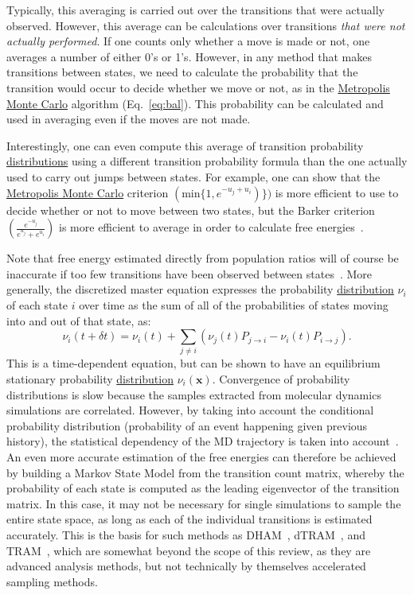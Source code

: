 \documentclass[9pt,review]{livecoms}
\newcommand{\vx}{\mathbf{x}}
\begin{document}
Typically, this averaging is carried out over the transitions that were actually observed. However, this average can be calculations over transitions \emph{that were not actually performed}. If one counts only whether a move is made or not, one averages a number of either 0's or 1's. However, in any method that makes transitions between states, we need to calculate the probability that the transition would occur to decide whether we move or not, as in the \hyperlink{ref:MetropolisMonteCarlo} {Metropolis Monte Carlo} algorithm (Eq.~\ref{eq:bal}).  This probability can be calculated and used in averaging even if the moves are not made.

Interestingly, one can even compute this average of transition probability \hyperlink{ref:Distribution} {distributions} using a different transition probability formula than the one actually used to carry out jumps between states. For example, one can show that the \hyperlink{ref:MetropolisMonteCarlo} {Metropolis Monte Carlo} criterion $(\mathrm{min} \{1,e^{-u_j+u_i})\})$ is more efficient to use to decide whether or not to move between two states, but the Barker criterion $\left(\frac{e^{-u_j}}{e^{u_j}+e^{u_i}}\right)$ is more efficient to average in order to calculate free energies~\citep{Liu:Biometrika:1996}.

Note that free energy estimated directly from population ratios will of course be inaccurate if too few transitions have been observed between states~\cite{No2009}.  More generally, the discretized master equation expresses the probability \hyperlink{ref:Distribution} {distribution} $\nu_i$ of each state $i$ over time as the sum of all of the probabilities of states moving into and out of that state, as:
\begin{equation}
   \nu_i(t + \delta t) = \nu_i(t) + \sum_{j \neq i} (\nu_j(t) P_{j\rightarrow i} - \nu_i(t) P_{i\rightarrow j}).
   \label{eq:master_equation}
\end{equation}
This is a time-dependent equation, but can be shown to have an equilibrium stationary probability \hyperlink{ref:Distribution} {distribution} $\nu_i(\vx)$. Convergence of probability distributions is slow because the samples extracted from molecular dynamics simulations are correlated. However, by taking into account the conditional probability distribution (probability of an event happening given previous history), the statistical dependency of the MD trajectory is taken into account~\cite{Wu:JCP:2014,Wu:MMS:2014,Rosta2014,Wu:PNAS:2016a}.
An even more accurate estimation of the free energies can therefore be achieved by building a Markov State Model from the transition count matrix, whereby the probability of each state is computed as the leading eigenvector of the transition matrix. In this case, it may not be necessary for single simulations to sample the entire state space, as long as each of the individual transitions is estimated accurately.  This is the basis for such methods as DHAM~\cite{Rosta2014}, dTRAM~\cite{Wu:JCP:2014,Wu:MMS:2014}, and TRAM~\cite{Wu:PNAS:2016a}, which are somewhat beyond the scope of this review, as they are advanced analysis methods, but not technically by themselves accelerated sampling methods.
\end{document}

